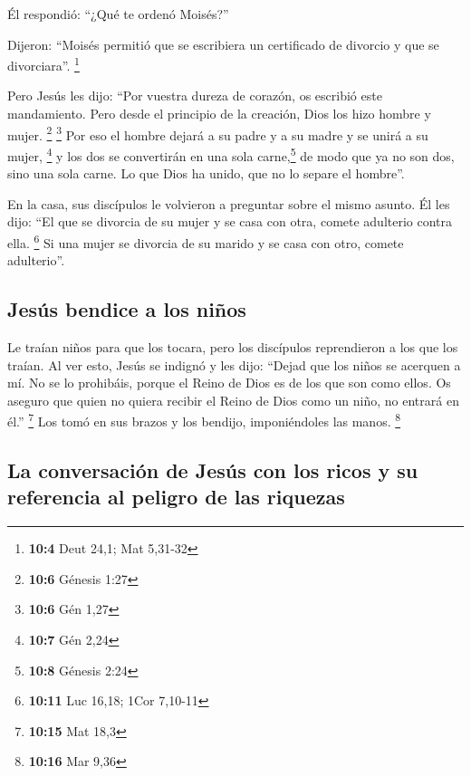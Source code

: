 Él respondió: ``¿Qué te ordenó Moisés?''

 Dijeron: ``Moisés permitió que se escribiera un
certificado de divorcio y que se divorciara''. \footnote{\textbf{10:4}
  Deut 24,1; Mat 5,31-32}

 Pero Jesús les dijo: ``Por vuestra dureza de corazón, os
escribió este mandamiento.  Pero desde el principio de la
creación, Dios los hizo hombre y mujer. \footnote{\textbf{10:6} Génesis
  1:27} \footnote{\textbf{10:6} Gén 1,27}  Por eso el
hombre dejará a su padre y a su madre y se unirá a su mujer, \footnote{\textbf{10:7}
  Gén 2,24}  y los dos se convertirán en una sola
carne,\footnote{\textbf{10:8} Génesis 2:24} de modo que ya no son dos,
sino una sola carne.  Lo que Dios ha unido, que no lo
separe el hombre''.

 En la casa, sus discípulos le volvieron a preguntar
sobre el mismo asunto.  Él les dijo: ``El que se divorcia
de su mujer y se casa con otra, comete adulterio contra ella.
\footnote{\textbf{10:11} Luc 16,18; 1Cor 7,10-11}  Si una
mujer se divorcia de su marido y se casa con otro, comete adulterio''.

\hypertarget{jesuxfas-bendice-a-los-niuxf1os}{%
\subsection{Jesús bendice a los
niños}\label{jesuxfas-bendice-a-los-niuxf1os}}

 Le traían niños para que los tocara, pero los discípulos
reprendieron a los que los traían.  Al ver esto, Jesús se
indignó y les dijo: ``Dejad que los niños se acerquen a mí. No se lo
prohibáis, porque el Reino de Dios es de los que son como ellos.
 Os aseguro que quien no quiera recibir el Reino de Dios
como un niño, no entrará en él.'' \footnote{\textbf{10:15} Mat 18,3}
 Los tomó en sus brazos y los bendijo, imponiéndoles las
manos. \footnote{\textbf{10:16} Mar 9,36}

\hypertarget{la-conversaciuxf3n-de-jesuxfas-con-los-ricos-y-su-referencia-al-peligro-de-las-riquezas}{%
\subsection{La conversación de Jesús con los ricos y su referencia al
peligro de las
riquezas}\label{la-conversaciuxf3n-de-jesuxfas-con-los-ricos-y-su-referencia-al-peligro-de-las-riquezas}}


